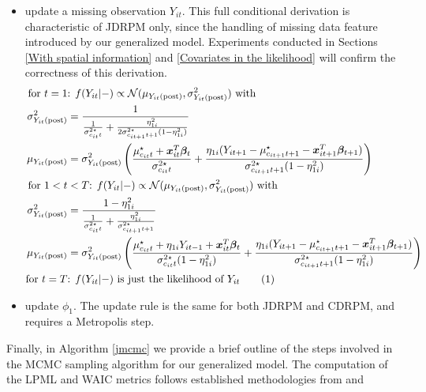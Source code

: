 \documentclass[12pt,	%
	a4paper,		%
	twoside,		%
	openright,		%
	titlepage,%
	]{book}
\newcommand\numberthis{\addtocounter{equation}{1}\tag{\theequation}}
\theoremstyle{definition}
\let\cite\citep
\begin{document}
\begin{itemize}
\item update a missing observation $Y_{it}$. This full conditional derivation is characteristic of JDRPM only, since the handling of missing data feature introduced by our generalized model. Experiments conducted in Sections \ref{With spatial information} and \ref{Covariates in the likelihood} will confirm the correctness of this derivation.
\begin{align*}
\text{for }t=1 &\text{: }
  f(Y_{it}|-)\propto \text{$\N(\mu_{\postp{Y_{it}}},\sigma^2_{\postp{Y_{it}}})$ with}\\
\sigma^2_{\postp{Y_{it}}}&= \frac{1}{\frac{1}{\sigma^{2\star}_{c_{it}t}} + \frac{\eta_{1i}^2}{2\sigma^{2\star}_{c_{it+1}t+1}(1-\eta_{1i}^2)}}\\
\mu_{\postp{Y_{it}}}&=  \sigma^2_{\postp{Y_{it}}} \left( \frac{\mu^\star_{c_{it}t} + \vec{x}_{it}^T\vec{\beta}_t}{\sigma^{2\star}_{c_{it}t}} + \frac{\eta_{1i}(Y_{it+1}-\mu^\star_{c_{it+1}t+1} - \vec{x}_{it+1}^T\vec{\beta}_{t+1})}{\sigma^{2\star}_{c_{it+1}t+1}(1-\eta_{1i}^2)} \right)\\
\text{for } 1<t&<T \text{: }
  f(Y_{it}|-)\propto \text{$\N(\mu_{\postp{Y_{it}}},\sigma^2_{\postp{Y_{it}}})$ with}\\
\sigma^2_{\postp{Y_{it}}}&= \frac{1-\eta_{1i}^2}{\frac{1}{\sigma^{2\star}_{c_{it}t}} + \frac{\eta_{1i}^2}{\sigma^{2\star}_{c_{it+1}t+1}}}\\
\mu_{\postp{Y_{it}}}&=  \sigma^2_{\postp{Y_{it}}} \left( \frac{\mu^\star_{c_{it}t} + \eta_{1i}Y_{it-1} 
 + \vec{x}_{it}^T\vec{\beta}_t}{\sigma^{2\star}_{c_{it}t}(1-\eta_{1i}^2)} + \frac{\eta_{1i}(Y_{it+1}-\mu^\star_{c_{it+1}t+1} - \vec{x}_{it+1}^T\vec{\beta}_{t+1})}{\sigma^{2\star}_{c_{it+1}t+1}(1-\eta_{1i}^2)} \right)\\
\text{for } t=T & \text{: }
    f(Y_{it}|-)\text{ is just the likelihood of $Y_{it}$}
\numberthis \label{update yit}
\end{align*}

\item update $\phi_1$. The update rule is the same for both JDRPM and CDRPM, and requires a Metropolis step.

\end{itemize}

Finally, in Algorithm \ref{jmcmc} we provide a brief outline of the steps involved in the MCMC sampling algorithm for our generalized model. The computation of the LPML and WAIC metrics follows established methodologies from \cite{paper-20} and \cite{paper-21}
\end{document}
